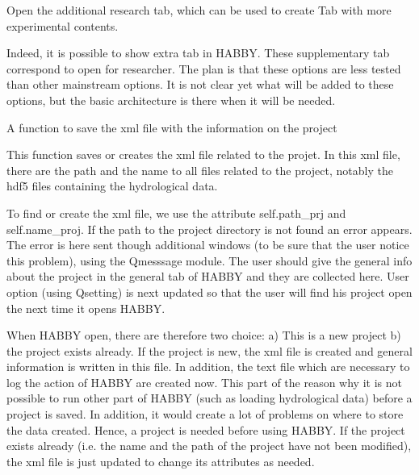 \documentclass[letterpaper,10pt,english]{sphinxmanual}
\begin{document}
\begin{fulllineitems}
\begin{fulllineitems}
\begin{quote}
\begin{description}
\end{description}\end{quote}

\end{fulllineitems}


\begin{fulllineitems}
\label{\detokenize{index:src_GUI.Main_windows_1.MainWindows.open_rech}}
Open the additional research tab, which can be used to create Tab with more experimental contents.

Indeed, it is possible to show extra tab in HABBY. These supplementary tab correspond to open for researcher.
The plan is that these options are less tested than other mainstream options. It is not clear yet what
will be added to these options, but the basic architecture is there when it will be needed.

\end{fulllineitems}


\begin{fulllineitems}
\label{\detokenize{index:src_GUI.Main_windows_1.MainWindows.save_project}}
A function to save the xml file with the information on the project


This function saves or creates the xml file related to the projet. In this xml file, there are the path and
the name to all files related to the project, notably the hdf5 files containing the hydrological data.

To find or create the xml file, we use the attribute self.path\_prj and self.name\_proj. If the path to
the project directory is not found an error appears. The error is here sent though additional windows
(to be sure that the user notice this problem), using the Qmesssage module. The user should give the general
info about the project in the general tab of HABBY and they are collected here. User option (using Qsetting)
is next updated so that the user will find his project open the next time it opens HABBY.

When HABBY open, there are therefore  two choice: a) This is a new project b) the project exists already.
If the project is new, the xml file is created and general information is written in this file. In addition,
the text file which are necessary to log the action of HABBY are created now. This part of the reason why it
is not possible to run other part of HABBY (such as loading hydrological data) before a project is saved.
In addition, it would create a lot of problems on where to store the data created. Hence, a project is needed
before using HABBY. If the project exists already (i.e. the name and the path of the project have not been
modified), the xml file is just updated to change its attributes as needed.


\end{fulllineitems}
\end{fulllineitems}
\end{document}
